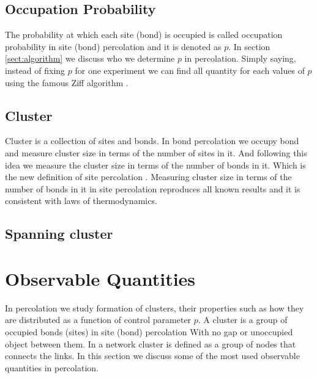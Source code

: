 	\subsection{Occupation Probability} \label{subsect:occupation-probability}
	The probability at which each site (bond) is occupied is called occupation probability in site (bond) percolation and it is denoted as $p$. In section \ref{sect:algorithm} we discuss who we determine $p$ in percolation. Simply saying, instead of fixing $p$ for one experiment we can find all quantity for each values of $p$ using the famous Ziff algorithm \cite{Newman2000, Newman2001}.
	
	\subsection{Cluster}
	Cluster is a collection of sites and bonds. In bond percolation we occupy bond and measure cluster size in terms of the number of sites in it. And following this idea we measure the cluster size in terms of the number of bonds in it. Which is the new definition of site percolation \cite{redefinition-of-site-percolation}. Measuring cluster size in terms of the number of bonds in it in site percolation reproduces all known results and it is consistent with laws of thermodynamics.
	\subsection{Spanning cluster}
	
\section{Observable Quantities}
	In percolation we study formation of clusters, their properties such as how they are distributed as a function of control parameter $p$. A cluster is a group of occupied bonds (sites) in site (bond) percolation \cite{redefinition-of-site-percolation} With no gap or unoccupied object between them. In a network cluster is defined as a group of nodes that connects the links. In this section we discuss some of the most used observable quantities in percolation.
	
	
	
